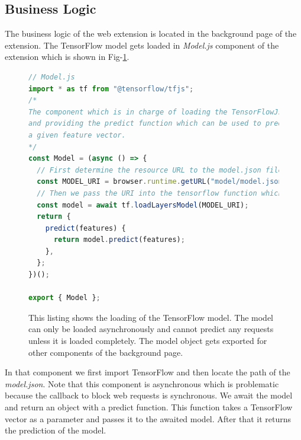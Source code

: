 \subsection{Business Logic}
\label{sec:bl}
The business logic of the web extension is located in the background page of the extension. 
The TensorFlow model gets loaded in \emph{Model.js} component of the extension which is shown in Fig-\ref{fig:Model}.
\begin{figure}[ht!]
  \begin{lstlisting}[language=JavaScript]
// Model.js
import * as tf from "@tensorflow/tfjs";
/*
The component which is in charge of loading the TensorFlowJs model 
and providing the predict function which can be used to predict 
a given feature vector.
*/ 
const Model = (async () => {
  // First determine the resource URL to the model.json file which includes all the metadata to the given model
  const MODEL_URI = browser.runtime.getURL("model/model.json");
  // Then we pass the URI into the tensorflow function which downloads the model structure and the model weights and stores them into memory
  const model = await tf.loadLayersModel(MODEL_URI);
  return {
    predict(features) {
      return model.predict(features);
    },
  };
})();

export { Model };
  \end{lstlisting}
  \caption{This listing shows the loading of the TensorFlow model. The model can only be loaded asynchronously and cannot predict any 
  requests unless it is loaded completely. The model object gets exported for other components of the background page.}
  \label{fig:Model}
\end{figure}

In that component we first import TensorFlow and then locate the path of the \emph{model.json}. Note that this component is asynchronous
which is problematic because the callback to block web requests is synchronous. We await the model and return an object with a predict function.
This function takes a TensorFlow vector as a parameter and passes it to the awaited model. After that it returns the prediction of the model.

